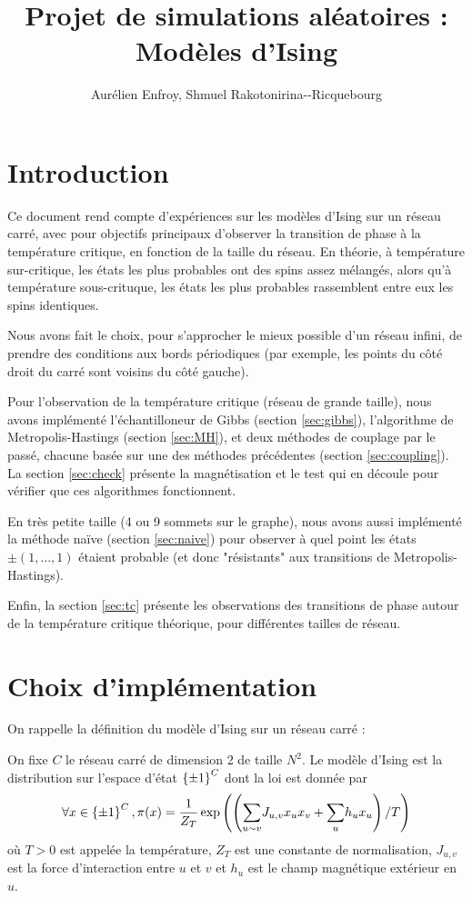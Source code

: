 \documentclass[a4paper,11pt]{article}
\title{Projet de simulations aléatoires : Modèles d'Ising}
\author{Aurélien Enfroy, Shmuel Rakotonirina{-}-Ricquebourg}
\begin{document}
\maketitle
\tableofcontents

\section{Introduction}

Ce document rend compte d'expériences sur les modèles d'Ising sur un réseau carré, avec pour objectifs principaux d'observer la transition de phase à la température critique, en fonction de la taille du réseau. En théorie, à température sur-critique, les états les plus probables ont des spins assez mélangés, alors qu'à température sous-crituque, les états les plus probables rassemblent entre eux les spins identiques.

Nous avons fait le choix, pour s'approcher le mieux possible d'un réseau infini, de prendre des conditions aux bords périodiques (par exemple, les points du côté droit du carré sont voisins du côté gauche).

Pour l'observation de la température critique (réseau de grande taille), nous avons implémenté l'échantilloneur de Gibbs (section \ref{sec:gibbs}), l'algorithme de Metropolis-Hastings (section \ref{sec:MH}), et deux méthodes de couplage par le passé, chacune basée sur une des méthodes précédentes (section \ref{sec:coupling}). La section \ref{sec:check} présente la magnétisation et le test qui en découle pour vérifier que ces algorithmes fonctionnent.

En très petite taille (4 ou 9 sommets sur le graphe), nous avons aussi implémenté la méthode naïve (section \ref{sec:naive}) pour observer à quel point les états $\pm(1,\hdots,1)$ étaient probable (et donc "résistants" aux transitions de Metropolis-Hastings).

Enfin, la section \ref{sec:tc} présente les observations des transitions de phase autour de la température critique théorique, pour différentes tailles de réseau.

\section{Choix d'implémentation}\label{sec:implementation}

On rappelle la définition du modèle d'Ising sur un réseau carré :
\begin{definition}
On fixe $C$ le réseau carré de dimension 2 de taille $N^2$. Le modèle d'Ising est la distribution sur l'espace d'état $\left\lbrace \pm 1 \right\rbrace^C$ dont la loi est donnée par
$$\forall x \in \left\lbrace \pm 1 \right\rbrace^C, \pi(x) = \frac{1}{Z_T} \exp \left(\left( \displaystyle{\sum_{u\sim v}^{}} J_{u,v} x_{u} x_{v} + \displaystyle{\sum_{u}^{}} h_{u} x_{u} \right)/T\right)$$
où $T>0$ est appelée la température, $Z_T$ est une constante de normalisation, $J_{u,v}$ est la force d'interaction entre $u$ et $v$ et $h_{u}$ est le champ magnétique extérieur en $u$.
\end{definition}
\end{document}
